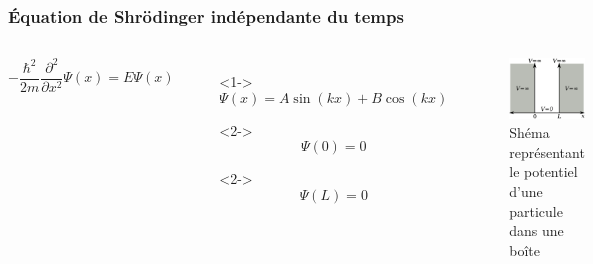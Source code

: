 \documentclass{beamer}
\begin{document}
\begin{frame}
\frametitle{Équation de Shrödinger indépendante du temps}

\begin{columns}

\begin{equation}\tag{4}
-\frac{\hbar^2}{2m}\frac{\partial^2}{\partial x^2}\Psi(x)=E\Psi(x)
\end{equation} 

\begin{itemize}
\item[]<1-> \begin{equation}\tag{5}
\Psi(x)=A\sin(kx)+B\cos(kx)
\end{equation} 
\item[]<2-> \begin{equation}\tag{6}
\Psi(0)=0
\end{equation} 
\item[]<2-> \begin{equation}\tag{7}
\Psi(L)=0
\end{equation} 
\end{itemize}
\begin{figure}
\includegraphics[scale=0.4]{Pot}
\caption{Shéma représentant le potentiel d'une particule dans une boîte}
\end{figure}
\end{columns}

\end{frame}
\end{document}
